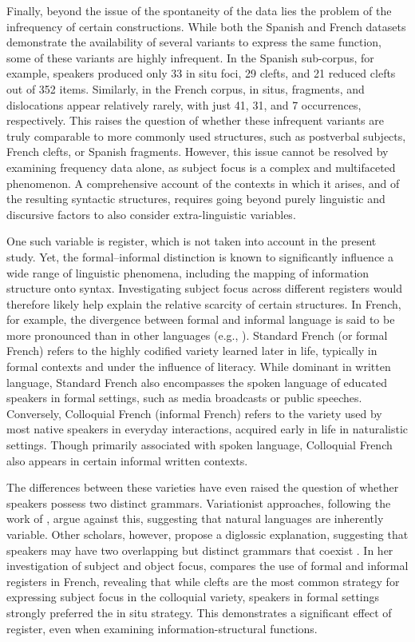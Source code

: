 Finally, beyond the issue of the spontaneity of the data lies the problem of the infrequency of certain constructions. While both the Spanish and French datasets demonstrate the availability of several variants to express the same function, some of these variants are highly infrequent. In the Spanish sub-corpus, for example, speakers produced only 33 in situ foci, 29 clefts, and 21 reduced clefts out of 352 items. Similarly, in the French corpus, in situs, fragments, and dislocations appear relatively rarely, with just 41, 31, and 7 occurrences, respectively.
This raises the question of whether these infrequent variants are truly comparable to more commonly used structures, such as postverbal subjects, French clefts, or Spanish fragments. However, this issue cannot be resolved by examining frequency data alone, as subject focus is a complex and multifaceted phenomenon. A comprehensive account of the contexts in which it arises, and of the resulting syntactic structures, requires going beyond purely linguistic and discursive factors to also consider extra-linguistic variables.

One such variable is register, which is not taken into account in the present study. Yet, the formal–informal distinction is known to significantly influence a wide range of linguistic phenomena, including the mapping of information structure onto syntax. Investigating subject focus across different registers would therefore likely help explain the relative scarcity of certain structures. In French, for example, the divergence between formal and informal language is said to be more pronounced than in other languages (e.g., \cite{blanche2006linguistic, katz2007teaching, hamlaoui2011role}). Standard French (or formal French) refers to the highly codified variety learned later in life, typically in formal contexts and under the influence of literacy. While dominant in written language, Standard French also encompasses the spoken language of educated speakers in formal settings, such as media broadcasts or public speeches.
Conversely, Colloquial French (informal French) refers to the variety used by most native speakers in everyday interactions, acquired early in life in naturalistic settings. Though primarily associated with spoken language, Colloquial French also appears in certain informal written contexts. 

The differences between these varieties have even raised the question of wheth\-er speakers possess two distinct grammars. Variationist approaches, following the work of \textcite{labov1972sociolinguistic}, argue against this, suggesting that natural languages are inherently variable. Other scholars, however, propose a diglossic explanation, suggesting that speakers may have two overlapping but distinct grammars that coexist \parencite{rowlett2011syntactic}.
In her investigation of subject and object focus, \textcite{destruel2016focus} compares the use of formal and informal registers in French, revealing that while clefts are the most common strategy for expressing subject focus in the colloquial variety, speakers in formal settings strongly preferred the in situ strategy. This demonstrates a significant effect of register, even when examining information-structural functions.

